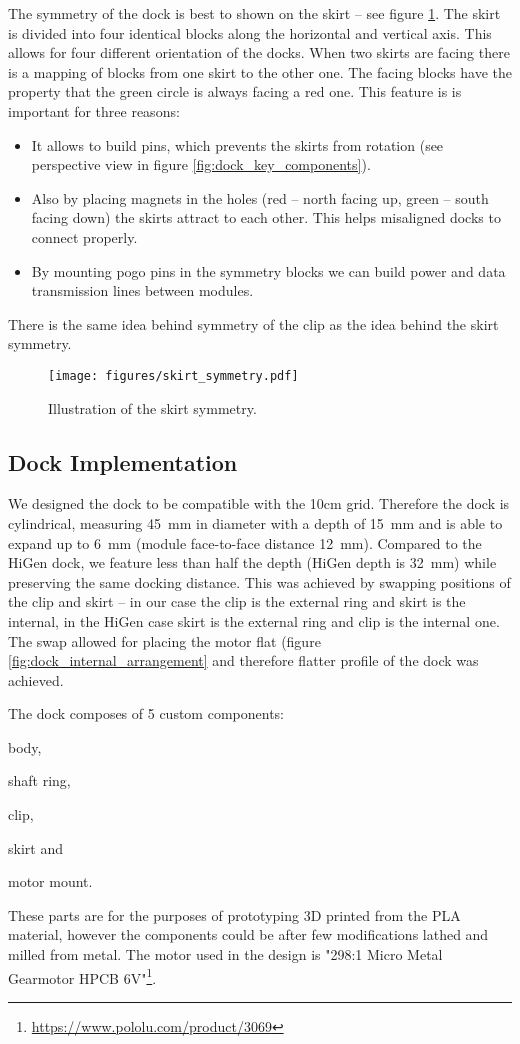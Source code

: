 The symmetry of the dock is best to shown on the skirt -- see figure
\ref{fig:dock_skirt_symmetry}. The skirt is divided into four identical blocks
along the horizontal and vertical axis. This allows for four different
orientation of the docks. When two skirts are facing there is a mapping of
blocks from one skirt to the other one. The facing blocks have the property that
the green circle is always facing a red one. This feature is is important for
three reasons:
\begin{itemize}
    \item It allows to build pins, which prevents the skirts from rotation (see
    perspective view in figure \ref{fig:dock_key_components}).
    \item Also by placing magnets in the holes (red -- north facing up, green --
    south facing down) the skirts attract to each other. This helps misaligned
    docks to connect properly.
    \item By mounting pogo pins  in the symmetry blocks we can build
    power and data transmission lines between modules.
\end{itemize}
There is the same idea behind symmetry of the clip as the idea behind the skirt
symmetry.

\begin{figure}
    \centering
    \texttt{[image: figures/skirt\_symmetry.pdf]}
    \caption{Illustration of the skirt symmetry.}
    \label{fig:dock_skirt_symmetry}
\end{figure}

\subsection{Dock Implementation}

We designed the dock to be compatible with the 10cm grid. Therefore the dock is
cylindrical, measuring 45~mm in diameter with a depth of 15~mm and is able to
expand up to 6~mm (module face-to-face distance 12~mm). Compared to the HiGen
dock, we feature less than half the depth (HiGen depth is 32~mm) while
preserving the same docking distance. This was achieved by swapping positions of
the clip and skirt -- in our case the clip is the external ring and skirt is the
internal, in the HiGen case skirt is the external ring and clip is the internal
one. The swap allowed for placing the motor flat (figure
\ref{fig:dock_internal_arrangement} and therefore flatter profile of the dock
was achieved.

The dock composes of 5 custom components:
\begin{enumerate*}
    \item body,
    \item shaft ring,
    \item clip,
    \item skirt and
    \item motor mount.
\end{enumerate*}
These parts are for the purposes of prototyping 3D printed from the PLA
material, however the components could be after few modifications lathed and
milled from metal. The motor used in the design is "298:1 Micro Metal Gearmotor
HPCB 6V"\footnote{\url{https://www.pololu.com/product/3069}}.

